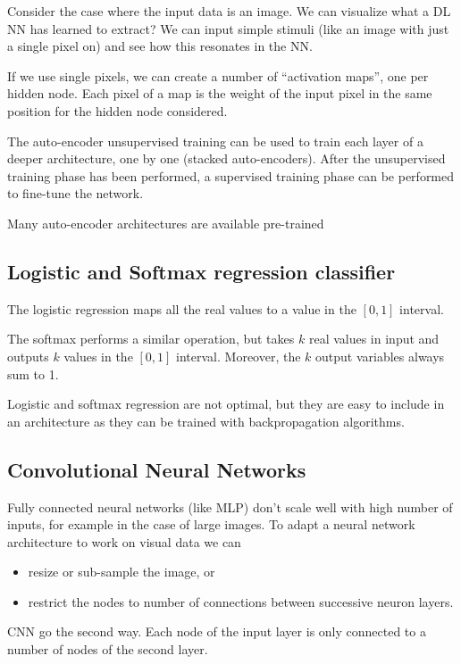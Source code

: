\documentclass[oneside,onecolumn]{report}
\begin{document}
Consider the case where the input data is an image.
We can visualize what a DL NN has learned to extract?
We can input simple stimuli (like an image with just a single pixel on) and see how this resonates in the NN.

If we use single pixels, we can create a number of ``activation maps'', one per hidden node.
Each pixel of a map is the weight of the input pixel in the same position for the hidden node considered.

The auto-encoder unsupervised training can be used to train each layer of a deeper architecture, one by one (stacked auto-encoders).
After the unsupervised training phase has been performed, a supervised training phase can be performed to fine-tune the network.

Many auto-encoder architectures are available pre-trained


\subsection{Logistic and Softmax regression classifier}
The logistic regression maps all the real values to a value in the $[0,1]$ interval.

The softmax performs a similar operation, but takes $k$ real values in input and outputs $k$ values in the $[0,1]$ interval.
Moreover, the $k$ output variables always sum to 1.

Logistic and softmax regression are not optimal, but they are easy to include in an architecture as they can be trained with backpropagation algorithms.




\subsection{Convolutional Neural Networks}
Fully connected neural networks (like MLP) don't scale well with high number of inputs, for example in the case of large images.
To adapt a neural network architecture to work on visual data we can
\begin{itemize}
    \item resize or sub-sample the image, or
    \item restrict the nodes to number of connections between successive neuron layers.
\end{itemize}

CNN go the second way.
Each node of the input layer is only connected to a number of nodes of the second layer.
\end{document}

